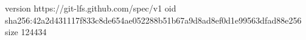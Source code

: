 version https://git-lfs.github.com/spec/v1
oid sha256:42a2d431117f833c8de654ae052288b51b67a9d8ad8ef0d1e99563dfad88e256
size 124434
